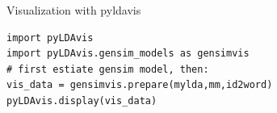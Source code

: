 \documentclass[compress]{beamer}
\begin{document}
\begin{frame}[plain]
\end{frame}




\begin{frame}[fragile]{Visualization with pyldavis}
\begin{lstlisting}
import pyLDAvis
import pyLDAvis.gensim_models as gensimvis
# first estiate gensim model, then:
vis_data = gensimvis.prepare(mylda,mm,id2word)
pyLDAvis.display(vis_data)
\end{lstlisting}
\end{frame}
\end{document}
